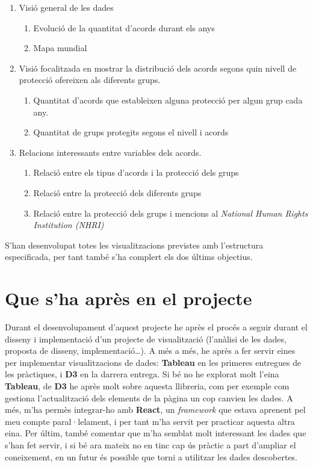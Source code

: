 \documentclass{article}
\begin{document}
\begin{enumerate}
    \item Visió general de les dades
        \begin{enumerate}
            \item Evolució de la quantitat d'acords durant els anys
            \item Mapa mundial
        \end{enumerate}
    \item Visió focalitzada en mostrar la distribució dels acords segons quin
        nivell de protecció ofereixen als diferents grups.
        \begin{enumerate}
            \item Quantitat d'acords que estableixen alguna protecció per algun
                grup cada any.
            \item Quantitat de grups protegits segons el nivell i acords
        \end{enumerate}
    \item Relacions interessants entre variables dels acords.
        \begin{enumerate}
            \item Relació entre els tipus d'acords i la protecció dels grups
            \item Relació entre la protecció dels diferents grups
            \item Relació entre la protecció dels grups i mencions al
                \textit{National Human Rights Institution (NHRI)}
        \end{enumerate}
\end{enumerate}

S'han desenvolupat totes les visualitzacions previstes amb l'estructura
especificada, per tant també s'ha complert els dos últims objectius.


\section{Que s'ha après en el projecte}
Durant el desenvolupament d'aquest projecte he après el procés a seguir durant
el disseny i implementació d'un projecte de visualització (l'anàlisi de les
dades, proposta de disseny, implementació\dots). A més a més, he après a fer
servir eines per implementar visualitzacions de dades: \textbf{Tableau} en les
primeres entregues de les pràctiques, i \textbf{D3} en la darrera entrega. Si
bé no he explorat molt l'eina \textbf{Tableau}, de \textbf{D3} he après molt
sobre aquesta llibreria, com per exemple com gestiona l'actualització dels
elements de la pàgina un cop canvien les dades. A més, m'ha permès integrar-ho
amb \textbf{React}, un \textit{framework} que estava aprenent pel meu compte
paral·lelament, i per tant m'ha servit per practicar aquesta altra eina. Per
últim, també comentar que m'ha semblat molt interessant les dades que s'han
fet servir, i si bé ara mateix no en tinc cap ús pràctic a part d'ampliar el
coneixement, en un futur és possible que torni a utilitzar les dades descobertes.
\end{document}
